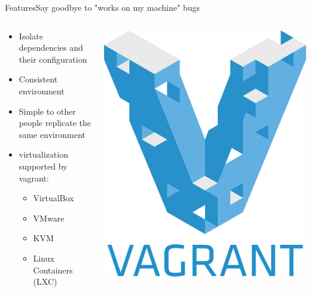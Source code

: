 \documentclass[10pt]{beamer}
\begin{document}
\begin{frame}{Features}{Say goodbye to "works on my machine" bugs}
  \begin{columns}[T]

    \begin{column}{.7\textwidth}
      \begin{itemize}
        \item Isolate dependencies and their configuration
        \item Consistent environment
        \item Simple to other people replicate the same environment
        \item virtualization supported by vagrant:
          \begin{itemize}
            \item VirtualBox
            \item VMware
            \item KVM
            \item Linux Containers (LXC)
          \end{itemize}
      \end{itemize}
    \end{column}

    \hfill

    \begin{column}{.3\textwidth}
      \centering
      \includegraphics[width=1\textwidth, keepaspectratio=true]{images/vagrant.png}
    \end{column}
  \end{columns}
\end{frame}
\end{document}
